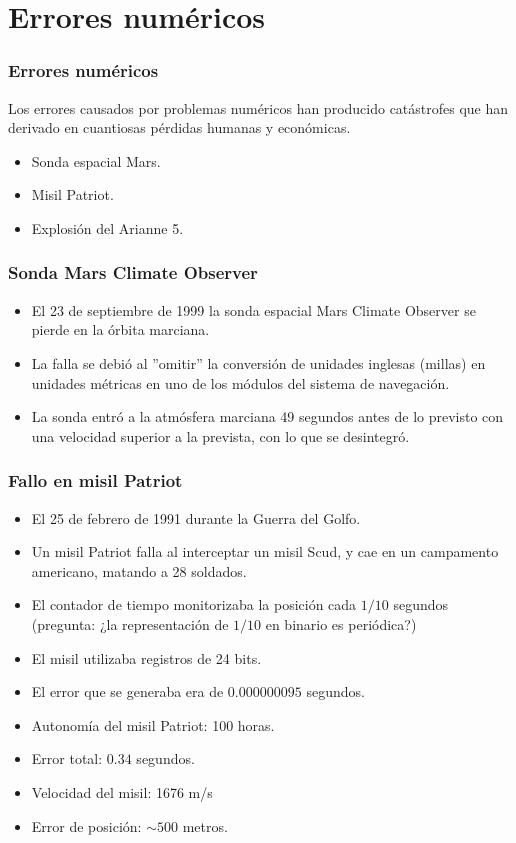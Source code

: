 \section{Errores numéricos}
\begin{frame}[fragile]
\frametitle{Errores numéricos}
Los errores causados por problemas numéricos han producido catástrofes que han derivado en cuantiosas pérdidas humanas y económicas.
\pause
\begin{itemize}[<+->]
\item Sonda espacial Mars.
\item Misil Patriot.
\item Explosión del Arianne 5.
\end{itemize}
\end{frame}
\begin{frame}[fragile]
\frametitle{Sonda Mars Climate Observer}
\begin{itemize}[<+->]
\item El 23 de septiembre de 1999 la sonda espacial Mars Climate Observer se pierde en la órbita marciana.
\item La falla se debió al ''omitir'' la conversión de unidades inglesas (millas) en unidades métricas en uno de los módulos del sistema de navegación.
\item La sonda entró a la atmósfera marciana 49 segundos antes de lo previsto con una velocidad superior a la prevista, con lo que se desintegró.
\end{itemize}
\end{frame}
\begin{frame}[fragile]
\frametitle{Fallo en misil Patriot}
\begin{itemize}[<+->]
\item El 25 de febrero de 1991 durante la Guerra del Golfo.
\item Un misil Patriot falla al interceptar un misil Scud, y cae en un campamento americano, matando a 28 soldados.
\item El contador de tiempo monitorizaba la posición cada $1/10$ segundos (pregunta: ¿la representación de $1/10$ en binario es periódica?)
\item El misil utilizaba registros de 24 bits.
\item El error que se generaba era de $0.000000095$ segundos.
\item Autonomía del misil Patriot: 100 horas.
\item Error total: $0.34$ segundos.
\item Velocidad del misil: 1676 m/s
\item Error de posición: $\sim500$ metros.
\end{itemize}
\end{frame}
